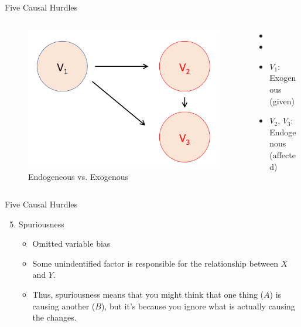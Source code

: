\documentclass[xcolor=dvipsnames]{beamer}
\begin{document}
	\begin{frame}[fragile]{Five Causal Hurdles}
		\begin{columns}[T]
			\begin{column}{0.6\textwidth}
				\begin{figure}
	        \centering
	        \includegraphics[width=0.8\linewidth]{endogeneity3.png}
        	\caption{Endogeneous vs. Exogenous}
	        \label{fig4}
	      \end{figure}
			\end{column}
			
			\begin{column}{0.36\textwidth}
			\begin{itemize}
			  \item[]
			  \item[]
			  \item $V_1$: Exogenous (given)
			  \item $V_2$, $V_3$: Endogenous (affected)
			\end{itemize}
			\end{column}
		\end{columns}
	\end{frame}


	\begin{frame}[fragile]{Five Causal Hurdles}
  \begin{enumerate}
  \setcounter{enumi}{4}
	  \item Spuriousness
	  \begin{itemize}
	    \item Omitted variable bias
	    \item Some unindentified factor is responsible for the relationship between $X$ and $Y$.
	    \item Thus, spuriousness means that you might think that one thing ($A$) is causing another ($B$), but it's because you ignore what is actually causing the changes.
	  \end{itemize}
	\end{enumerate}
	\end{frame}
	
\end{document}
